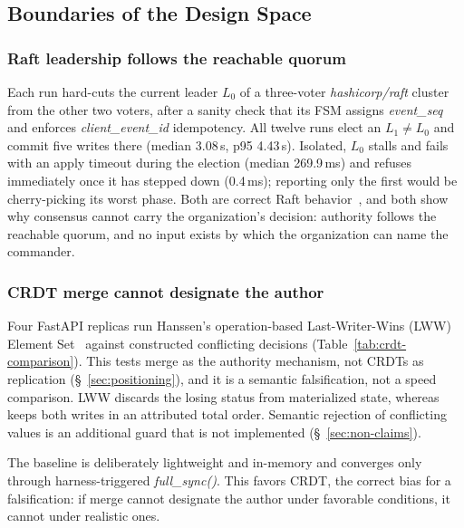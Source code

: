 \subsection{Boundaries of the Design Space}
\label{sec:eval-scope}

\subsubsection{Raft leadership follows the reachable quorum}
\label{sec:eval-raft}

Each run hard-cuts the current leader $L_0$ of a three-voter
\textit{hashicorp/raft} cluster from the other two voters, after a sanity check
that its FSM assigns \textit{event\_seq} and enforces \textit{client\_event\_id}
idempotency. All twelve runs elect an $L_1 \ne L_0$ and commit five writes there
(median 3.08\,s, p95 4.43\,s). Isolated, $L_0$ stalls and fails with an apply
timeout during the election (median 269.9\,ms) and refuses immediately once it
has stepped down (0.4\,ms); reporting only the first would be cherry-picking its
worst phase. Both are correct Raft behavior~\cite{ongaro2014raft}, and both show why
consensus cannot carry the organization's decision: authority follows the reachable
quorum, and no input exists by which the organization can name the commander.

\subsubsection{CRDT merge cannot designate the author}
\label{sec:eval-crdt}

Four FastAPI replicas run Hanssen's operation-based Last-Writer-Wins (LWW) Element
Set~\cite{hanssen2025emergency} against constructed conflicting decisions
(Table~\ref{tab:crdt-comparison}). This tests merge as the authority mechanism, not
CRDTs as replication (\S~\ref{sec:positioning}), and it is a semantic falsification,
not a speed comparison. LWW discards the losing status from materialized state, whereas
\systemname{} keeps both writes in an attributed total order. Semantic rejection of
conflicting values is an additional guard that is not implemented
(\S~\ref{sec:non-claims}).

The baseline is deliberately lightweight and in-memory and converges only through
harness-triggered \textit{full\_sync()}. This favors CRDT, the correct bias for a
falsification: if merge cannot designate the author under favorable conditions, it
cannot under realistic ones.

